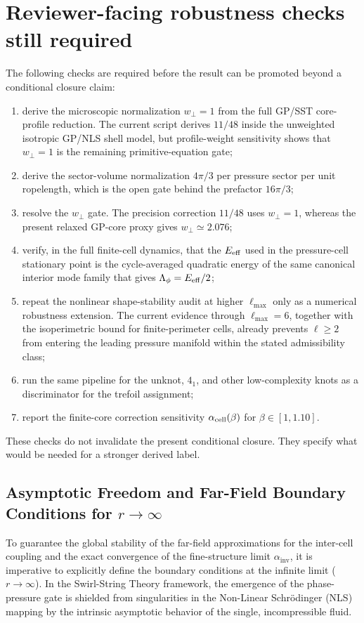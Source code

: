 \documentclass[11pt]{article}
\begin{document}
\section{Reviewer-facing robustness checks still required}
\label{sec:reviewer-checks}

The following checks are required before the result can be promoted beyond a
conditional closure claim:
\begin{enumerate}
\item derive the microscopic normalization \(w_\perp=1\) from the full GP/SST
core-profile reduction.  The current script derives \(11/48\) inside the
unweighted isotropic GP/NLS shell model, but profile-weight sensitivity shows
that \(w_\perp=1\) is the remaining primitive-equation gate;
\item derive the sector-volume normalization \(4\pi/3\) per pressure sector
per unit ropelength, which is the open gate behind the prefactor \(16\pi/3\);
\item resolve the \(w_\perp\) gate.  The precision correction \(11/48\) uses
\(w_\perp=1\), whereas the present relaxed GP-core proxy gives
\(w_\perp\simeq2.076\);
\item verify, in the full finite-cell dynamics, that the \(E_{\rm eff}\) used
in the pressure-cell stationary point is the cycle-averaged quadratic energy of
the same canonical interior mode family that gives
\(\Lambda_\phi=E_{\rm eff}/2\);
\item repeat the nonlinear shape-stability audit at higher \(\ell_{\max}\) only as a numerical robustness extension.  The current evidence through \(\ell_{\max}=6\), together with the isoperimetric bound for finite-perimeter cells, already prevents \(\ell\ge2\) from entering the leading pressure manifold within the stated admissibility class;
\item run the same pipeline for the unknot, \(4_1\), and other low-complexity
knots as a discriminator for the trefoil assignment;
\item report the finite-core correction sensitivity
\(\alpha_{\rm cell}(\beta)\) for \(\beta\in[1,1.10]\).
\end{enumerate}
These checks do not invalidate the present conditional closure.  They specify
what would be needed for a stronger derived label.
    

    \subsection{Asymptotic Freedom and Far-Field Boundary Conditions for $r \to \infty$}
        \label{sec:asymptotic_freedom_alpha_limit}
        To guarantee the global stability of the far-field approximations for the inter-cell coupling and the exact convergence of the fine-structure limit $\alpha_{\text{inv}}$, it is imperative to explicitly define the boundary conditions at the infinite limit ($r \to \infty$). In the Swirl-String Theory framework, the emergence of the phase-pressure gate is shielded from singularities in the Non-Linear Schr\"odinger (NLS) mapping by the intrinsic asymptotic behavior of the single, incompressible fluid.
        
\end{document}
